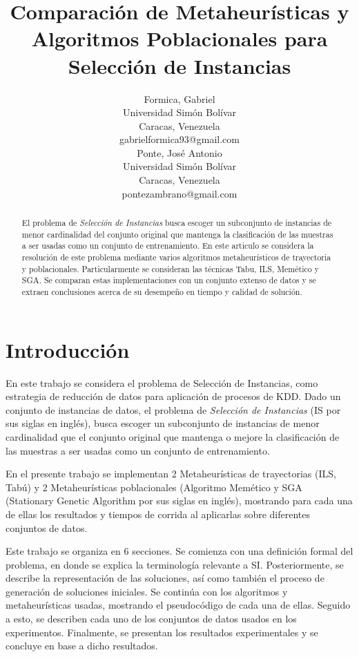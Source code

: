 \documentclass[11pt]{article}
\title{Comparación de Metaheurísticas y Algoritmos Poblacionales
       para Selección de Instancias}
\author{Formica, Gabriel\\
  Universidad Simón Bolívar\\
  Caracas, Venezuela\\
  {gabrielformica93@gmail.com} \\\And
  Ponte, José Antonio\\
  Universidad Simón Bolívar\\
  Caracas, Venezuela\\
  {pontezambrano@gmail.com} \\}
\date{}
\begin{document}
\maketitle

\begin{abstract}
  El problema de \textit{Selección de Instancias}  busca
  escoger un subconjunto de instancias de menor cardinalidad del conjunto original
  que mantenga la clasificación de las muestras a ser usadas como un conjunto
  de entrenamiento. En este articulo se considera la resolución de este problema mediante varios algoritmos metaheurísticos de trayectoria y poblacionales. Particularmente se consideran las técnicas Tabu, ILS, Memético y SGA. Se comparan estas implementaciones con un conjunto extenso de datos y se extraen conclusiones acerca de su desempeño en tiempo y calidad de solución.
\end{abstract}

\section{Introducción}
  En este trabajo se considera el problema de Selección de Instancias, como
  estrategia de reducción de datos para aplicación de procesos de KDD. Dado un conjunto de
  instancias de datos, el problema de 
  \textit{Selección de Instancias} (IS por sus siglas en inglés), busca
  escoger un subconjunto de instancias de menor cardinalidad que el conjunto original
  que mantenga o mejore la clasificación de las muestras a ser usadas como un conjunto
  de entrenamiento. 
  
  En el presente trabajo se implementan 2 Metaheurísticas de trayectorias 
  (ILS, Tabú) y 2 Metaheurísticas poblacionales (Algoritmo Memético y 
  SGA (Stationary Genetic Algorithm por sus siglas en inglés), 
  mostrando para cada una de ellas los resultados 
  y tiempos de corrida al aplicarlas sobre diferentes conjuntos de datos.

  Este trabajo se organiza en 6 secciones. Se comienza con una definición
  formal del problema, en donde se explica la terminología relevante a SI. 
  Posteriormente, se describe la representación de las soluciones, así 
  como también el proceso de generación de soluciones iniciales. Se continúa
  con los algoritmos y metaheurísticas usadas, mostrando el pseudocódigo de cada
  una de ellas. Seguido a esto, se describen cada uno de los conjuntos de datos usados
  en los experimentos. Finalmente, se presentan los resultados experimentales y se 
  concluye en base a dicho resultados.
\end{document}
